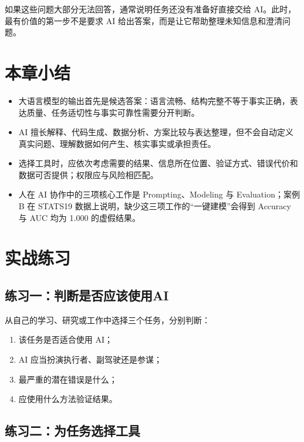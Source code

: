 如果这些问题大部分无法回答，通常说明任务还没有准备好直接交给 AI。此时，最有价值的第一步不是要求 AI 给出答案，而是让它帮助整理未知信息和澄清问题。

\section{本章小结}

\begin{itemize}
  \item 大语言模型的输出首先是候选答案：语言流畅、结构完整不等于事实正确，表达质量、任务适切性与事实可靠性需要分开判断。
  \item AI 擅长解释、代码生成、数据分析、方案比较与表达整理，但不会自动定义真实问题、理解数据如何产生、核实事实或承担责任。
  \item 选择工具时，应依次考虑需要的结果、信息所在位置、验证方式、错误代价和数据可否提供；权限应与风险相匹配。
  \item 人在 AI 协作中的三项核心工作是 Prompting、Modeling 与 Evaluation；案例 B 在 STATS19 数据上说明，缺少这三项工作的“一键建模”会得到 Accuracy 与 AUC 均为 1.000 的虚假结果。
\end{itemize}

\section{实战练习}

\subsection*{练习一：判断是否应该使用AI}

从自己的学习、研究或工作中选择三个任务，分别判断：

\begin{enumerate}
  \item 该任务是否适合使用 AI；
  \item AI 应当扮演执行者、副驾驶还是参谋；
  \item 最严重的潜在错误是什么；
  \item 应使用什么方法验证结果。
\end{enumerate}

\subsection*{练习二：为任务选择工具}

